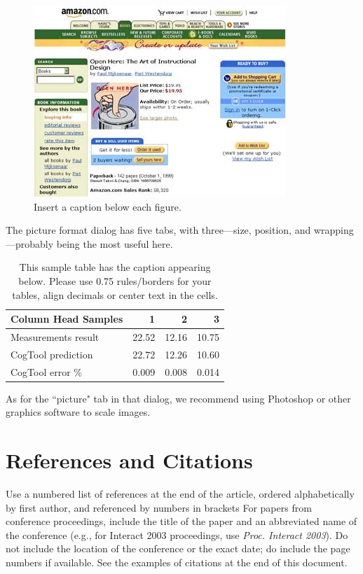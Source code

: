 \documentclass{chi-ext}
\newcommand\tabhead[1]{\textbf{#1}}
\begin{document}
\begin{figure}
  \centering
  \includegraphics[width=0.7\columnwidth]{sample.jpg}
  \caption{Insert a caption below each figure.}
  \label{fig:sample}
\end{figure}

The picture format dialog has five tabs, with three---size, position, and wrapping---probably being the most useful here.

\begin{table}
\centering
	\begin{tabular}{|l|r|r|r|}
	\hline
	\tabhead{Column Head Samples} & \tabhead{1} & \tabhead{2} & \tabhead{3} \\
	\hline
	Measurements result & 22.52 & 12.16 & 10.75 \\\hline
	CogTool prediction & 22.72 & 12.26 & 10.60 \\\hline
	CogTool error \% & 0.009 & 0.008 & 0.014 \\\hline
	\end{tabular}
	\caption{This sample table has the caption appearing below.
	Please use 0.75 rules/borders for your tables, align decimals or
	center text in the cells.}\label{tab:sample}
\end{table}

As for the ``picture" tab in that dialog, we recommend using Photoshop or other graphics software to scale images.

\section{References and Citations}
Use a numbered list of references at the end of the article, ordered alphabetically by first author, and referenced by numbers in brackets \cite{Anderson92,Klemmer02,Mather00,Zellweger01}
For papers from conference proceedings, include the title of the paper and an abbreviated name of the conference (e.g., for Interact 2003 proceedings, use \emph{Proc. Interact 2003}). 
Do not include the location of the conference or the exact date; do include the page numbers if available. 
See the examples of citations at the end of this document. 
\end{document}

